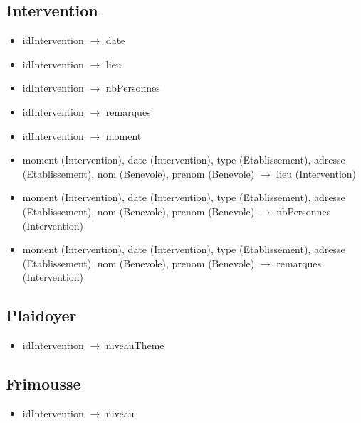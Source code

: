 \documentclass[asi, sansVersion]{picInsa}
\begin{document}
\subsection*{Intervention}
\begin{itemize}
\item[]	idIntervention $\rightarrow$ date
\item[]	idIntervention $\rightarrow$ lieu
\item[]	idIntervention $\rightarrow$ nbPersonnes
\item[]	idIntervention $\rightarrow$ remarques
\item[]	idIntervention $\rightarrow$ moment
\item[] moment (Intervention), date (Intervention), type (Etablissement), adresse (Etablissement), nom (Benevole), prenom (Benevole) $\rightarrow$ lieu (Intervention)
\item[] moment (Intervention), date (Intervention), type (Etablissement), adresse (Etablissement), nom (Benevole), prenom (Benevole) $\rightarrow$ nbPersonnes (Intervention)
\item[] moment (Intervention), date (Intervention), type (Etablissement), adresse (Etablissement), nom (Benevole), prenom (Benevole) $\rightarrow$ remarques (Intervention)
\end{itemize}

\subsection*{Plaidoyer}
\begin{itemize}
\item[]	idIntervention $\rightarrow$ niveauTheme
\end{itemize}

\subsection*{Frimousse}
\begin{itemize}
\item[] idIntervention $\rightarrow$ niveau
\end{itemize}
\end{document}
